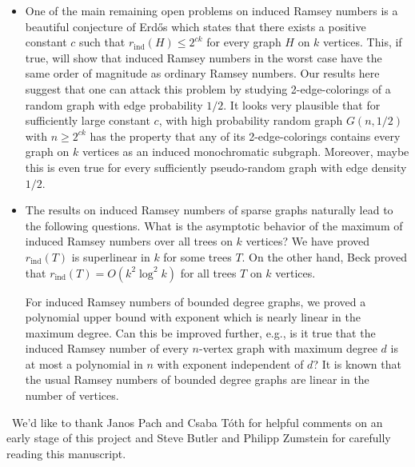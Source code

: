 \documentclass[11pt]{article}
\begin{document}
\begin{itemize}
\item
One of the main remaining open problems on induced Ramsey numbers is
a beautiful conjecture of Erd\H{o}s which states that there exists a
positive constant $c$ such that $r_{\textrm{ind}}(H) \leq 2^{ck}$
for every graph $H$ on $k$ vertices. This, if true, will show that
induced Ramsey numbers in the worst case have the same order of
magnitude as ordinary Ramsey numbers. Our results here suggest that
one can attack this problem by studying 2-edge-colorings of a random
graph with edge probability $1/2$. It looks very plausible that for
sufficiently large constant $c$, with high probability random graph
$G(n,1/2)$ with $n\geq 2^{ck}$ has the property that any of its
2-edge-colorings contains every graph on $k$ vertices as an induced
monochromatic subgraph. Moreover, maybe this is even true for every
sufficiently pseudo-random graph with edge density $1/2$.


\item The results on induced Ramsey numbers of sparse graphs naturally
lead to the following questions. What is the asymptotic
behavior of the maximum of induced Ramsey numbers over all trees on
$k$ vertices? We have proved $r_{\textrm{ind}}(T)$ is superlinear in
$k$ for some trees $T$. On the other hand, Beck
\cite{Be} proved that $r_{\textrm{ind}}(T)=O\left( k^{2}\log^2
k\right)$ for all trees $T$ on $k$ vertices.

For induced Ramsey numbers of bounded degree graphs, we proved a
polynomial upper bound with exponent which is nearly linear in the
maximum degree. Can this be improved further, e.g., is it true that
the induced Ramsey number of every $n$-vertex graph with maximum
degree $d$ is at most a polynomial in $n$ with exponent independent
of $d$? It is known that the usual Ramsey numbers of bounded degree
graphs are linear in the number of vertices.
\end{itemize}

\vspace{0.2cm} \, We'd like to thank
Janos Pach and Csaba T\'oth for helpful comments on an early stage
of this project and Steve Butler and Philipp Zumstein for carefully
reading this manuscript.
\end{document}
